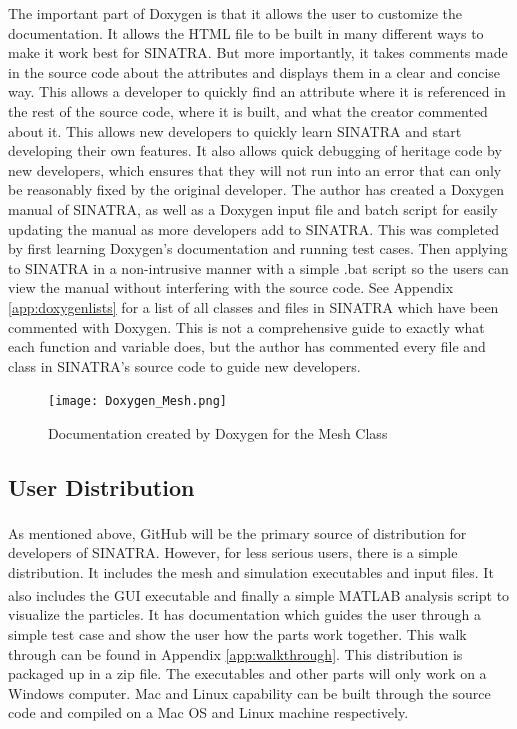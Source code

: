 
\indent The important part of Doxygen is that it allows the user to customize the documentation. It allows the HTML file to be built in many different ways to make it work best for SINATRA. But more importantly, it takes comments made in the source code about the attributes and displays them in a clear and concise way. This allows a developer to quickly find an attribute where it is referenced in the rest of the source code, where it is built, and what the creator commented about it. This allows new developers to quickly learn SINATRA and start developing their own features. It also allows quick debugging of heritage code by new developers, which ensures that they will not run into an error that can only be reasonably fixed by the original developer. The author has created a Doxygen manual of SINATRA, as well as a Doxygen input file and batch script for easily updating the manual as more developers add to SINATRA. This was completed by first learning Doxygen's documentation and running test cases. Then applying to SINATRA in a non-intrusive manner with a simple .bat script so the users can view the manual without interfering with the source code. See Appendix \ref{app:doxygenlists} for a list of all classes and files in SINATRA which have been commented with Doxygen. This is not a comprehensive guide to exactly what each function and variable does, but the author has commented every file and class in SINATRA's source code to guide new developers. 


\begin{figure}
\texttt{[image: Doxygen\_Mesh.png]}
\centering
\caption{Documentation created by Doxygen for the Mesh Class}
\label{fig:Doxygen_Mesh}
\end{figure}


\subsection{User Distribution}

As mentioned above, GitHub\textsuperscript{\textregistered} will be the primary source of distribution for developers of SINATRA. However, for less serious users, there is a simple distribution. It includes the mesh and simulation executables and input files. It also includes the GUI executable and finally a simple MATLAB\textsuperscript{\textregistered} analysis script to visualize the particles. It has documentation which guides the user through a simple test case and show the user how the parts work together. This walk through can be found in Appendix \ref{app:walkthrough}. This distribution is packaged up in a zip file. The executables and other parts will only work on a Windows computer. Mac and Linux capability can be built through the source code and compiled on a Mac OS and Linux machine respectively. \par 


